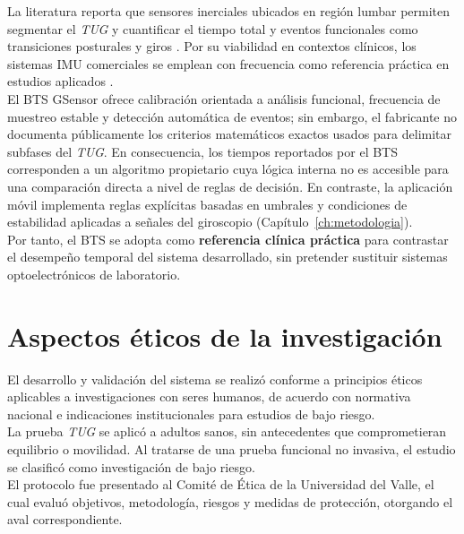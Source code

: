 \documentclass[12pt]{report}
\begin{document}
\begin{justify}
    La literatura reporta que sensores inerciales ubicados en región lumbar permiten segmentar el \textit{TUG} y cuantificar el tiempo total y eventos funcionales como transiciones posturales y giros \cite{Salarian2010_TUG_IMU,Mancini2012_TUG_IMU,Bugane2012_GaitPosture}. Por su viabilidad en contextos clínicos, los sistemas IMU comerciales se emplean con frecuencia como referencia práctica en estudios aplicados \cite{DelDin2016_IMU_Review}.\\

    El BTS GSensor ofrece calibración orientada a análisis funcional, frecuencia de muestreo estable y detección automática de eventos; sin embargo, el fabricante no documenta públicamente los criterios matemáticos exactos usados para delimitar subfases del \textit{TUG}. En consecuencia, los tiempos reportados por el BTS corresponden a un algoritmo propietario cuya lógica interna no es accesible para una comparación directa a nivel de reglas de decisión. En contraste, la aplicación móvil implementa reglas explícitas basadas en umbrales y condiciones de estabilidad aplicadas a señales del giroscopio (Capítulo~\ref{ch:metodologia}).\\

    Por tanto, el BTS se adopta como \textbf{referencia clínica práctica} para contrastar el desempeño temporal del sistema desarrollado, sin pretender sustituir sistemas optoelectrónicos de laboratorio.


    \section{Aspectos éticos de la investigación}

    El desarrollo y validación del sistema se realizó conforme a principios éticos aplicables a investigaciones con seres humanos, de acuerdo con normativa nacional e indicaciones institucionales para estudios de bajo riesgo.\\

    La prueba \textit{TUG} se aplicó a adultos sanos, sin antecedentes que comprometieran equilibrio o movilidad. Al tratarse de una prueba funcional no invasiva, el estudio se clasificó como investigación de bajo riesgo.\\

    El protocolo fue presentado al Comité de Ética de la Universidad del Valle, el cual evaluó objetivos, metodología, riesgos y medidas de protección, otorgando el aval correspondiente.\\


\end{justify}
\end{document}
